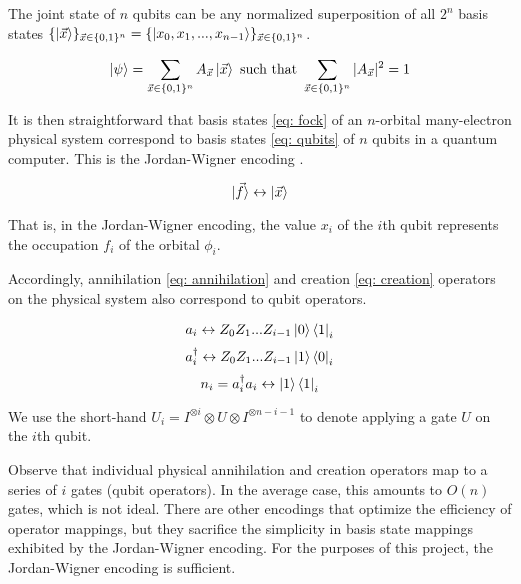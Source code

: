 The joint state of $n$ qubits can be any normalized superposition of all $2^n$ basis states $\{\ket{\vec{x}}\}_{\vec{x} \in \{0, 1\}^n} = \{\ket{x_0, x_1, ..., x_{n - 1}}\}_{\vec{x} \in \{0, 1\}^n}$.

\begin{equation}
    \ket{\psi} = \sum_{\vec{x} \in \{0, 1\}^n} A_{\vec{x}} \ket{\vec{x}} \text{ such that } \sum_{\vec{x} \in \{0, 1\}^n} |A_{\vec{x}}|^2 = 1 \label{eq: qubits}
\end{equation}

It is then straightforward that basis states \eqref{eq: fock} of an $n$-orbital many-electron physical system correspond to basis states \eqref{eq: qubits} of $n$ qubits in a quantum computer. This is the Jordan-Wigner encoding \cite{QCC}.

\begin{equation}
    \ket{\vec{f}} \leftrightarrow \ket{\vec{x}}
\end{equation}

That is, in the Jordan-Wigner encoding, the value $x_i$ of the $i$th qubit represents the occupation $f_i$ of the orbital $\phi_i$.

Accordingly, annihilation \eqref{eq: annihilation} and creation \eqref{eq: creation} operators \cite{QCC} on the physical system also correspond to qubit operators.

\begin{equation}
    a_i \leftrightarrow Z_0Z_1...Z_{i - 1}\ket{0}\bra{1}_i \label{eq: JWdown}
\end{equation}
\begin{equation}
    a^\dag_i \leftrightarrow Z_0Z_1...Z_{i - 1}\ket{1}\bra{0}_i \label{eq: JWup}
\end{equation}
\begin{equation}
    n_i = a^\dag_ia_i \leftrightarrow \ket{1}\bra{1}_i \label{eq: JWnum}
\end{equation}

We use the short-hand $U_i = I^{\otimes i}\otimes U \otimes I^{\otimes n - i - 1}$ to denote applying a gate $U$ on the $i$th qubit.

Observe that individual physical annihilation and creation operators map to a series of $i$ gates (qubit operators). In the average case, this amounts to $O(n)$ gates, which is not ideal. There are other encodings that optimize the efficiency of operator mappings, but they sacrifice the simplicity in basis state mappings exhibited by the Jordan-Wigner encoding. For the purposes of this project, the Jordan-Wigner encoding is sufficient.

